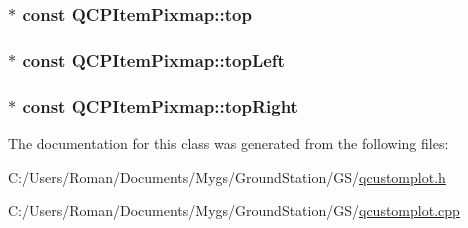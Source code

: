 \subsubsection[{top}]{$\ast$ const Q\+C\+P\+Item\+Pixmap\+::top}\label{class_q_c_p_item_pixmap_af7a156590b1d59ab21b453c430c56a7c}
\hypertarget{class_q_c_p_item_pixmap_a43c281ef6ad46f3cf04f365289abe51a}{}
\subsubsection[{top\+Left}]{$\ast$ const Q\+C\+P\+Item\+Pixmap\+::top\+Left}\label{class_q_c_p_item_pixmap_a43c281ef6ad46f3cf04f365289abe51a}
\hypertarget{class_q_c_p_item_pixmap_a72eabd0010be41a4ec1b22aa983d2aa1}{}
\subsubsection[{top\+Right}]{$\ast$ const Q\+C\+P\+Item\+Pixmap\+::top\+Right}\label{class_q_c_p_item_pixmap_a72eabd0010be41a4ec1b22aa983d2aa1}


The documentation for this class was generated from the following files\+:\begin{DoxyCompactItemize}
\item 
C\+:/\+Users/\+Roman/\+Documents/\+Mygs/\+Ground\+Station/\+G\+S/\hyperlink{qcustomplot_8h}{qcustomplot.\+h}\item 
C\+:/\+Users/\+Roman/\+Documents/\+Mygs/\+Ground\+Station/\+G\+S/\hyperlink{qcustomplot_8cpp}{qcustomplot.\+cpp}\end{DoxyCompactItemize}

